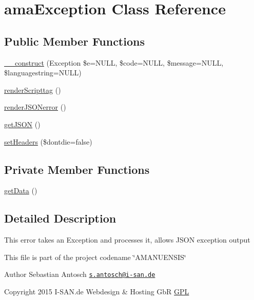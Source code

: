 \hypertarget{a00003}{}\section{ama\+Exception Class Reference}
\label{a00003}
\subsection*{Public Member Functions}
\begin{DoxyCompactItemize}
\item 
\hyperlink{a00003_a4cbb6824ef0bc9a8d7bf88edac87cd7c}{\+\_\+\+\_\+construct} (Exception \$e=N\+U\+L\+L, \$code=N\+U\+L\+L, \$message=N\+U\+L\+L, \$languagestring=N\+U\+L\+L)
\item 
\hyperlink{a00003_a14cc1d72966a1d957beac76c396918fa}{render\+Scripttag} ()
\item 
\hyperlink{a00003_ad66ce26ace5f2cd20176981ce338e33b}{render\+J\+S\+O\+Nerror} ()
\item 
\hyperlink{a00003_a9d884d237da6c676af88b9c5bfbdc142}{get\+J\+S\+O\+N} ()
\item 
\hyperlink{a00003_a4d3f23834a02dec47b2188bf0b800377}{set\+Headers} (\$dontdie=false)
\end{DoxyCompactItemize}
\subsection*{Private Member Functions}
\begin{DoxyCompactItemize}
\item 
\hyperlink{a00003_a81a67162a6288d78fc4c55283325f0b4}{get\+Data} ()
\end{DoxyCompactItemize}


\subsection{Detailed Description}
This error takes an Exception and processes it, allows J\+S\+O\+N exception output

This file is part of the project codename \char`\"{}\+A\+M\+A\+N\+U\+E\+N\+S\+I\+S\char`\"{}

\begin{DoxyAuthor}{Author}
Sebastian Antosch \href{mailto:s.antosch@i-san.de}{\tt s.\+antosch@i-\/san.\+de} 
\end{DoxyAuthor}
\begin{DoxyCopyright}{Copyright}
2015 I-\/\+S\+A\+N.\+de Webdesign \& Hosting Gb\+R \hyperlink{}{G\+P\+L }
\end{DoxyCopyright}


